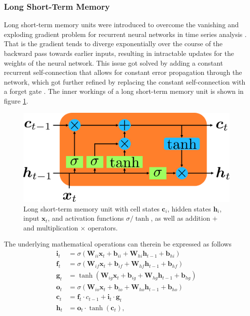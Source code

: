\subsubsection{Long Short-Term Memory}
Long short-term memory units were introduced to overcome the vanishing and exploding gradient problem for recurrent neural networks in time series analysis \cite{hochreiter1997long}. That is the gradient tends to diverge exponentially over the course of the backward pass towards earlier inputs, resulting in intractable updates for the weights of the neural network. This issue got solved by adding a constant recurrent self-connection that allows for constant error propagation through the network, which got further refined by replacing the constant self-connection with a forget gate \cite{gers1999learning}. The inner workings of a long short-term memory unit is shown in figure \ref{fig::221_lstm}. 
\begin{figure}[h!]
	\centering
	\includegraphics[scale=.28]{chapters/02_background/img/lstm.png}
	\caption{Long short-term memory unit with cell states $\bm{c}_i$, hidden states $\bm{h}_i$, input $\bm{x}_t$, and activation functions $\sigma/\tanh$, as well as addition $+$ and multiplication $\times$ operators.}
	\label{fig::221_lstm}
\end{figure}
The underlying mathematical operations can therein be expressed as follows
\begin{align}
	\bm{i}_t &= \sigma(\bm{W}_{ii}\bm{x}_t+\bm{b}_{ii}+\bm{W}_{hi}\bm{h}_{t-1}+\bm{b}_{hi})\\
	\bm{f}_t &= \sigma(\bm{W}_{if}\bm{x}_t+\bm{b}_{if}+\bm{W}_{hf}\bm{h}_{t-1}+\bm{b}_{hf})\\
	\bm{g}_t &= \tanh(\bm{W}_{ig}\bm{x}_t+\bm{b}_{ig}+\bm{W}_{hg}\bm{h}_{t-1}+\bm{b}_{hg})\\
	\bm{o}_t &= \sigma(\bm{W}_{io}\bm{x}_t+\bm{b}_{io}+\bm{W}_{ho}\bm{h}_{t-1}+\bm{b}_{ho})\\
	\bm{c}_t &= \bm{f}_t\cdot c_{t-1} + \bm{i}_t\cdot\bm{g}_t\\
	\bm{h}_t &= \bm{o}_t \cdot\tanh(\bm{c}_t),
\end{align}
